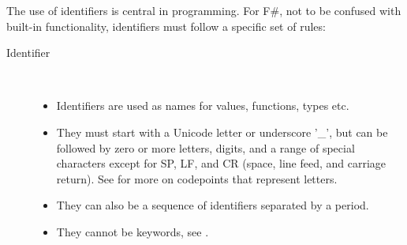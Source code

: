 \documentclass[fsharpNotes.tex]{subfiles}
\begin{document}
The use of identifiers is central in programming. For F\#, not to be confused with built-in functionality, identifiers must follow a specific set of rules: 
\begin{description} 
\item[Identifier]~\\[-5mm]
  \begin{itemize}
  \item Identifiers are used as names for values, functions, types etc.
  \item They must start with a Unicode letter or underscore '\_', but can be followed by zero or more letters, digits, and a range of special characters except for SP, LF, and CR (space, line feed, and carriage return). See  for more on codepoints that represent letters. 
  \item They can also be a sequence of identifiers separated by a period.
  \item They cannot be keywords, see .
  \end{itemize}
\end{description}
\end{document}
